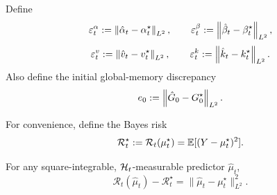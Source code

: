 \begin{definition}
\label{ass:gla_errors}
Define
\begin{equation}
\varepsilon_t^\alpha := \left\lVert \hat\alpha_t-\alpha_t^\star \right\rVert_{L^2},
\qquad
\varepsilon_t^\beta := \left\lVert \hat\beta_t-\beta_t^\star \right\rVert_{L^2},
\label{eq:gate_errors}
\end{equation}
\begin{equation}
\varepsilon_t^v := \left\lVert \hat v_t-v_t^\star \right\rVert_{L^2},
\qquad
\varepsilon_t^k := \left\lVert \hat k_t-k_t^\star \right\rVert_{L^2}.
\label{eq:feature_errors}
\end{equation}
Also define the initial global-memory discrepancy
\begin{equation}
e_0 := \left\lVert \hat G_0-G_0^\star \right\rVert_{L^2}.
\label{eq:initial_memory_error}
\end{equation}
\end{definition}

For convenience, define the Bayes risk
\begin{equation}
\mathcal R_t^\star := \mathcal R_t(\mu_t^\star) = \mathbb{E}[(Y-\mu_t^\star)^2].
\label{eq:bayes_risk}
\end{equation}









\begin{lemma}
\label{lem:bayes_excess_identity}
For any square-integrable, $\mathcal{H}_t$-measurable predictor $\hat\mu_t$,
\begin{equation}
\mathcal R_t(\hat\mu_t)-\mathcal R_t^\star
=
\|\hat\mu_t-\mu_t^\star\|_{L^2}^2.
\label{eq:bayes_excess_identity}
\end{equation}
\end{lemma}

